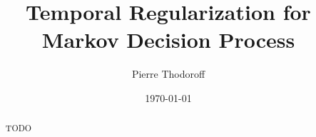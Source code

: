 \documentclass[12pt, oneside, extrafontsizes]{memoir}  %
\begin{document}

\pretitle{\begin{center}\cftchapterfont\huge}
\posttitle{\end{center}}
\preauthor{\begin{center}\huge}
\postauthor{\end{center}}
\predate{\begin{center}\large}
\postdate{\end{center}}

\title{Temporal Regularization for Markov Decision Process }
\author{Pierre Thodoroff}
\date{\today}
\renewcommand\maketitlehookb{
\vfill
}
\renewcommand\maketitlehookc{
\vfill
\begin{center}
{
\large
Computer Science\\
McGill University, Montreal
}
\end{center}
\vspace{10mm}
}
\renewcommand\maketitlehookd{
\vspace{10mm}
A thesis submitted to McGill University in partial fulfilment of the requirements of
the degree of Master of Science.
\copyright Pierre Thodoroff; \today.
}

\begin{titlingpage}
\maketitle
\end{titlingpage}


\clearpage
{}
\renewcommand{\abstractname}{Acknowledgements}
\begin{abstract}
TODO
\end{abstract}
\end{document}
